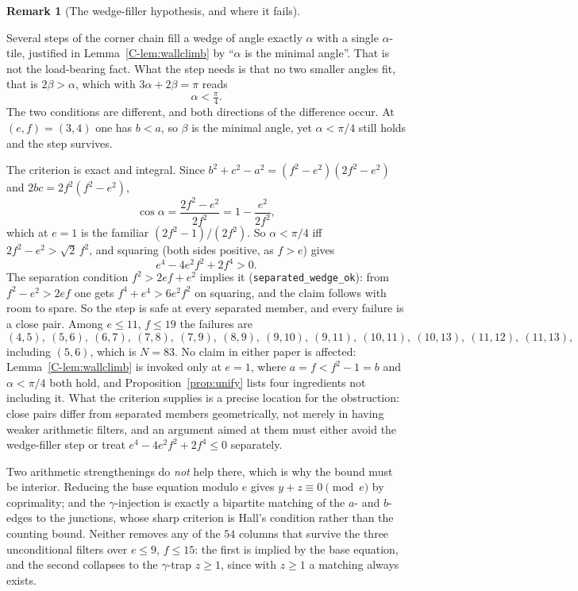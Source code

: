 \documentclass[11pt,reqno]{amsart}
\theoremstyle{plain}
\theoremstyle{definition}
\newtheorem{remark}[theorem]{Remark}
\begin{document}
\begin{remark}[The wedge-filler hypothesis, and where it fails]\label{O-alphamin}

Several steps of the corner chain fill a wedge of angle exactly $\alpha$ with a single
$\alpha$-tile, justified in Lemma~\ref{C-lem:wallclimb} by ``$\alpha$ is the minimal angle''. That is
not the load-bearing fact. What the step needs is that no two smaller angles fit, that is
$2\beta>\alpha$, which with $3\alpha+2\beta=\pi$ reads
\[
\alpha<\tfrac\pi4 .
\]
The two conditions are different, and both directions of the difference occur. At $(e,f)=(3,4)$ one
has $b<a$, so $\beta$ is the minimal angle, yet $\alpha<\pi/4$ still holds and the step survives.

The criterion is exact and integral. Since $b^2+c^2-a^2=(f^2-e^2)(2f^2-e^2)$ and
$2bc=2f^2(f^2-e^2)$,
\[
\cos\alpha=\frac{2f^2-e^2}{2f^2}=1-\frac{e^2}{2f^2},
\]
which at $e=1$ is the familiar $(2f^2-1)/(2f^2)$. So $\alpha<\pi/4$ iff $2f^2-e^2>\sqrt2\,f^2$, and
squaring (both sides positive, as $f>e$) gives
\[
e^4-4e^2f^2+2f^4>0 .
\]
The separation condition $f^2>2ef+e^2$ implies it (\texttt{separated\_wedge\_ok}): from
$f^2-e^2>2ef$ one gets $f^4+e^4>6e^2f^2$ on squaring, and the claim follows with room to spare. So
the step is safe at every separated member, and every failure is a close pair. Among $e\le11$,
$f\le19$ the failures are
\[
(4,5),\ (5,6),\ (6,7),\ (7,8),\ (7,9),\ (8,9),\ (9,10),\ (9,11),\ (10,11),\ (10,13),\ (11,12),\ (11,13),
\]
including $(5,6)$, which is $N=83$. No claim in either paper is affected: Lemma~\ref{C-lem:wallclimb}
is invoked only at $e=1$, where $a=f<f^2-1=b$ and $\alpha<\pi/4$ both hold, and
Proposition~\ref{prop:unify} lists four ingredients not including it. What the criterion supplies is
a precise location for the obstruction: close pairs differ from separated members geometrically, not
merely in having weaker arithmetic filters, and an argument aimed at them must either avoid the
wedge-filler step or treat $e^4-4e^2f^2+2f^4\le0$ separately.

Two arithmetic strengthenings do \emph{not} help there, which is why the bound must be interior.
Reducing the base equation modulo $e$ gives $y+z\equiv0\pmod e$ by coprimality; and the
$\gamma$-injection is exactly a bipartite matching of the $a$- and $b$-edges to the junctions, whose
sharp criterion is Hall's condition rather than the counting bound. Neither removes any of the $54$
columns that survive the three unconditional filters over $e\le9$, $f\le15$: the first is implied by
the base equation, and the second collapses to the $\gamma$-trap $z\ge1$, since with $z\ge1$ a
matching always exists.
\end{remark}
\end{document}
